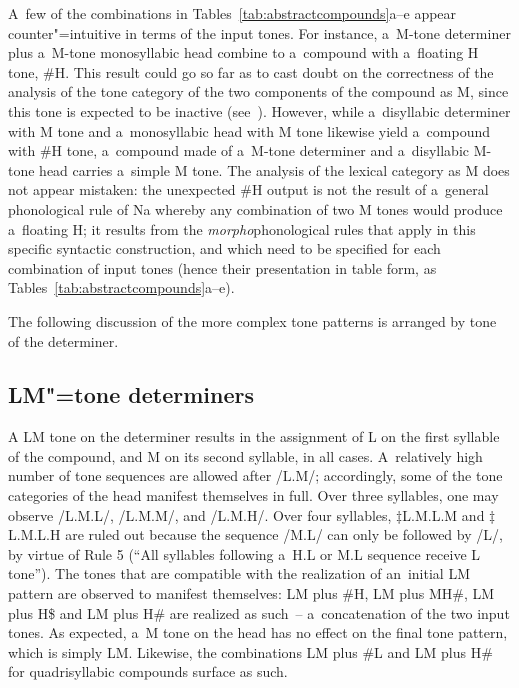 A~few of the combinations in Tables~\ref{tab:abstractcompounds}a--e appear counter"=intuitive in terms of the input tones. For
instance, a~M-tone determiner plus a~M-tone monosyllabic head combine to a~compound with a~floating H tone, \#H. This result could go so far as to cast doubt
on the correctness of the analysis of the tone category of the two components of the compound as M,
since this tone is expected to be inactive (see~). However, while
a~disyllabic determiner with M tone and a~monosyllabic head with M tone likewise yield a~compound
with \#H tone, a~compound made of a~M-tone determiner and a~disyllabic M-tone head carries a~simple
M tone. The analysis of the lexical category as M does not appear mistaken: the unexpected \#H
output is not the result of a~general {phonological rule} of Na whereby any combination of two M tones
would produce a~floating H; it results from the \textit{morpho}{phonological rules} that apply in this specific
syntactic construction, and which need to be specified for each combination of input tones (hence their presentation in table form, as Tables~\ref{tab:abstractcompounds}a--e).

The following discussion of the more {complex tone} patterns is arranged by tone of the determiner.

\subsection{LM"=tone determiners}

A LM tone on the determiner results in the assignment of L on the first syllable of the compound,
and M on its second syllable, in all cases. A~relatively high number of tone sequences are allowed after
/L.M/; accordingly, some of the tone categories of the
head manifest themselves in full. Over three syllables, one may observe /L.M.L/, /L.M.M/, and /L.M.H/. Over four syllables, $\ddagger${\kern2pt}L.M.L.M and $\ddagger${\kern2pt}L.M.L.H are ruled out because the sequence /M.L/ can only be followed by /L/, by virtue
of Rule 5 (“All syllables following a~H.L or M.L sequence receive L tone”). The tones that are compatible with the realization of an~initial LM pattern are
observed to manifest themselves: LM plus \#H, LM plus MH\#, LM plus H\$ and LM plus
H\# are realized as such~-- a~concatenation of the two input tones. As expected, a~M tone on the
head has no effect on the final tone pattern, which is simply LM. Likewise, the combinations LM plus \#L and
LM plus H\# for quadrisyllabic compounds surface as such.

